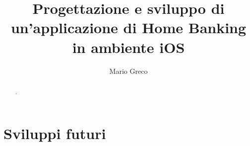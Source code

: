 \documentclass[LaM,binding=0.6cm]{sapthesis}
\title{Progettazione e sviluppo di un'applicazione di Home Banking in ambiente iOS}
\author{Mario Greco}
\begin{document}
\onehalfspace 
\frontmatter

\maketitle

\dedication{Dedicato a\\}

\begin{abstract}
.
\end{abstract}

\begin{acknowledgments}

\end{acknowledgments}

\tableofcontents

% 
% 
% 
% 
% 
% 




\mainmatter







\chapter{Sviluppi futuri}

% 
% 
% 
\end{document}
